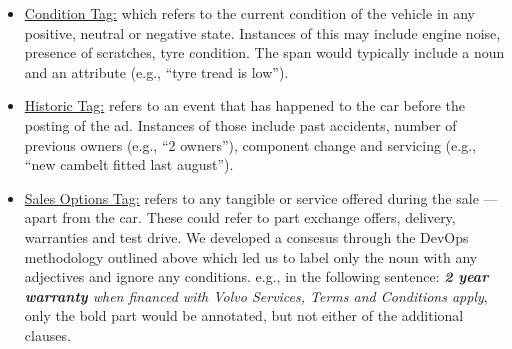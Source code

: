 \documentclass[11pt]{article}
\begin{document}



\begin{itemize}[leftmargin=*,itemsep=0pt,parsep=0.2pt]
    \item \underline{Condition Tag:} which refers to the current condition of the vehicle in any positive, neutral or negative state. Instances of this may include engine noise, presence of scratches, tyre condition. The span would typically include a noun and an attribute (e.g., ``tyre tread is low''). 
    
    \item \underline{Historic Tag:} refers to an event that has happened to the car before the posting of the ad. Instances of those include past accidents, number of previous owners (e.g., ``2 owners''), component change and servicing (e.g., ``new cambelt fitted last august''). 

    \item \underline{Sales Options Tag:} refers to any tangible or service offered during the sale --- apart from the car. These could refer to part exchange offers, delivery, warranties and test drive. We developed a consesus through the DevOps methodology outlined above which led us to label only the noun with any adjectives and ignore any conditions. e.g., in the following sentence: \textit{\textbf{2 year warranty} when financed with Volvo Services, Terms and Conditions apply}, only the bold part would be annotated, but not either of the additional clauses.
    
\end{itemize}
\end{document}
